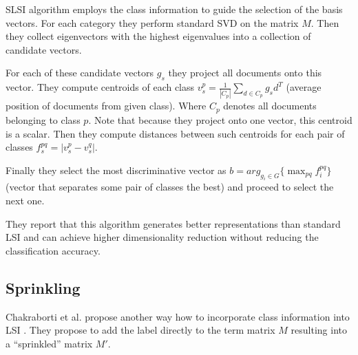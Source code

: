         SLSI algorithm employs the class information to guide the selection of the basis vectors. 
        For each category they perform standard SVD on the matrix $M$.
        Then they collect eigenvectors with the highest eigenvalues into a collection of candidate vectors.
        
        For each of these candidate vectors $g_s$ they project all documents onto this vector.
        They compute centroids of each class $v_s^p = \frac{1}{|C_p|}\sum_{d\in C_p} g_s d^T$ (average position of documents from given class). 
        Where $C_p$ denotes all documents belonging to class $p$.
        Note that because they project onto one vector, this centroid is a scalar. 
        Then they compute distances between such centroids for each pair of classes $f_s^{pq} = |v_s^p - v_s^q|$.
        
        Finally they select the most discriminative vector as $b=arg_{g_i \in G} \{\max_{p q} f_i^{p q} \}$ (vector that separates some pair of classes the best) and proceed to select the next one.
        
        They report that this algorithm generates better representations than standard LSI and can achieve higher dimensionality reduction without reducing the classification accuracy.
        
    \subsection{Sprinkling}
        Chakraborti et al. propose another way how to incorporate class information into LSI \cite{chakraborti2006sprinkling}\cite{chakraborti2007supervised}.
        They propose to add the label directly to the term matrix $M$ resulting into a ``sprinkled'' matrix $M'$.

